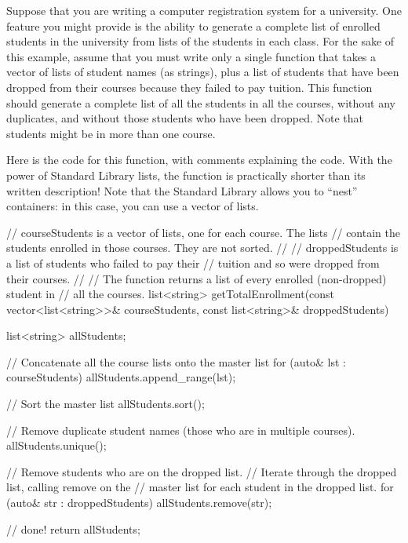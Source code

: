 
Suppose that you are writing a computer registration system for a university. One feature you might provide is the ability to generate a complete list of enrolled students in the university from lists of the students in each class. For the sake of this example, assume that you must write only a single function that takes a vector of lists of student names (as strings), plus a list of students that have been dropped from their courses because they failed to pay tuition. This function should generate a complete list of all the students in all the courses, without any duplicates, and without those students who have been dropped. Note that students might be in more than one course.

Here is the code for this function, with comments explaining the code. With the power of Standard Library lists, the function is practically shorter than its written description! Note that the Standard Library allows you to “nest” containers: in this case, you can use a vector of lists.

\begin{cpp}
// courseStudents is a vector of lists, one for each course. The lists
// contain the students enrolled in those courses. They are not sorted.
//
// droppedStudents is a list of students who failed to pay their
// tuition and so were dropped from their courses.
//
// The function returns a list of every enrolled (non-dropped) student in
// all the courses.
list<string> getTotalEnrollment(const vector<list<string>>& courseStudents,
                                const list<string>& droppedStudents)
{
    list<string> allStudents;

    // Concatenate all the course lists onto the master list
    for (auto& lst : courseStudents) {
        allStudents.append_range(lst);
    }

    // Sort the master list
    allStudents.sort();

    // Remove duplicate student names (those who are in multiple courses).
    allStudents.unique();

    // Remove students who are on the dropped list.
    // Iterate through the dropped list, calling remove on the
    // master list for each student in the dropped list.
    for (auto& str : droppedStudents) {
        allStudents.remove(str);
    }

    // done!
    return allStudents;
}
\end{cpp}

